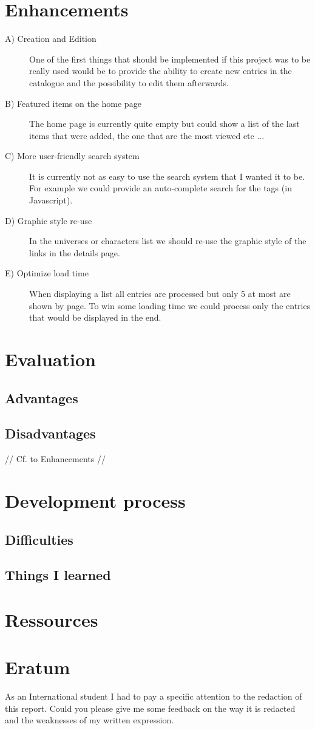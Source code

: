 \documentclass[10pt, a4paper]{article}
\begin{document}
	\section{Enhancements}
	\begin{description}
		\item[A) Creation and Edition] One of the first things that should be implemented if this project was to be really used would be to provide the ability to create new entries in the catalogue and the possibility to edit them afterwards.
		\item[B) Featured items on the home page] The home page is currently quite empty but could show a list of the last items that were added, the one that are the most viewed etc ...
		\item[C) More user-friendly search system] It is currently not as easy to use the search system that I wanted it to be. For example we could provide an auto-complete search for the tags (in Javascript).
		\item[D) Graphic style re-use] In the universes or characters list we should re-use the graphic style of the links in the details page. 
		\item[E) Optimize load time] When displaying a list all entries are processed but only 5 at most are shown by page. To win some loading time we could process only the entries that would be displayed in the end. 
	\end{description}
	
	\section{Evaluation}
	\subsection{Advantages}
	
	\subsection{Disadvantages}
	// Cf. to Enhancements //

	\section{Development process}
	\subsection{Difficulties}
	
	\subsection{Things I learned}
	
	\section{Ressources}
	
	\section{Eratum}
	As an International student I had to pay a specific attention to the redaction of this report. Could you please give me some feedback on the way it is redacted and the weaknesses of my written expression.
		
\end{document}
